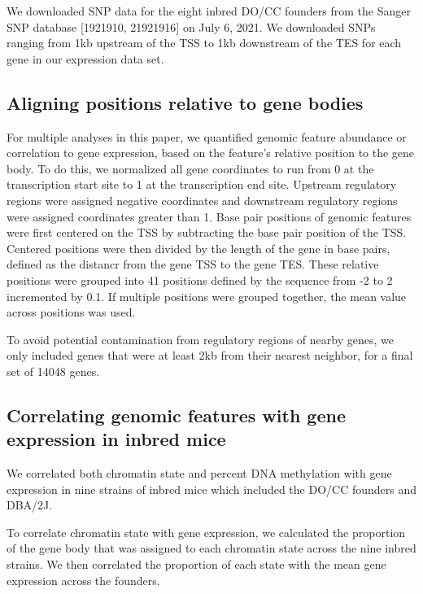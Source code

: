 \documentclass[10pt,letterpaper]{article}
\begin{document}
We downloaded SNP data for the eight inbred DO/CC founders from the
Sanger SNP database {[}1921910, 21921916{]} on July 6, 2021. We
downloaded SNPs ranging from 1kb upstream of the TSS to 1kb downstream
of the TES for each gene in our expression data set.

\hypertarget{aligning-positions-relative-to-gene-bodies}{%
\subsection{Aligning positions relative to gene
bodies}\label{aligning-positions-relative-to-gene-bodies}}

For multiple analyses in this paper, we quantified genomic feature
abundance or correlation to gene expression, based on the feature's
relative position to the gene body. To do this, we normalized all gene
coordinates to run from 0 at the transcription start site to 1 at the
transcription end site. Upstream regulatory regions were assigned
negative coordinates and downstream regulatory regions were assigned
coordinates greater than 1. Base pair positions of genomic features were
first centered on the TSS by subtracting the base pair position of the
TSS. Centered positions were then divided by the length of the gene in
base pairs, defined as the distancr from the gene TSS to the gene TES.
These relative positions were grouped into 41 positions defined by the
sequence from -2 to 2 incremented by 0.1. If multiple positions were
grouped together, the mean value across positions was used.

To avoid potential contamination from regulatory regions of nearby
genes, we only included genes that were at least 2kb from their nearest
neighbor, for a final set of 14048 genes.

\hypertarget{correlating-genomic-features-with-gene-expression-in-inbred-mice}{%
\subsection{Correlating genomic features with gene expression in inbred
mice}\label{correlating-genomic-features-with-gene-expression-in-inbred-mice}}

We correlated both chromatin state and percent DNA methylation with gene
expression in nine strains of inbred mice which included the DO/CC
founders and DBA/2J.

To correlate chromatin state with gene expression, we calculated the
proportion of the gene body that was assigned to each chromatin state
across the nine inbred strains. We then correlated the proportion of
each state with the mean gene expression across the founders.
\end{document}
